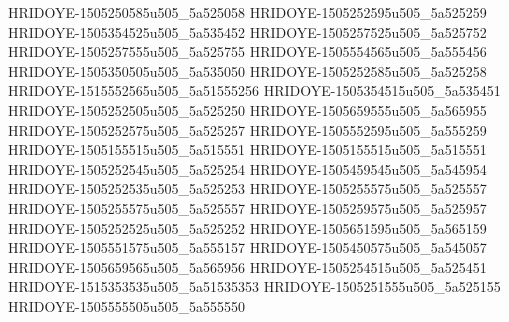 HRIDOYE-1505250585u505_5a525058
HRIDOYE-1505252595u505_5a525259
HRIDOYE-1505354525u505_5a535452
HRIDOYE-1505257525u505_5a525752
HRIDOYE-1505257555u505_5a525755
HRIDOYE-1505554565u505_5a555456
HRIDOYE-1505350505u505_5a535050
HRIDOYE-1505252585u505_5a525258
HRIDOYE-1515552565u505_5a51555256
HRIDOYE-1505354515u505_5a535451
HRIDOYE-1505252505u505_5a525250
HRIDOYE-1505659555u505_5a565955
HRIDOYE-1505252575u505_5a525257
HRIDOYE-1505552595u505_5a555259
HRIDOYE-1505155515u505_5a515551
HRIDOYE-1505155515u505_5a515551
HRIDOYE-1505252545u505_5a525254
HRIDOYE-1505459545u505_5a545954
HRIDOYE-1505252535u505_5a525253
HRIDOYE-1505255575u505_5a525557
HRIDOYE-1505255575u505_5a525557
HRIDOYE-1505259575u505_5a525957
HRIDOYE-1505252525u505_5a525252
HRIDOYE-1505651595u505_5a565159
HRIDOYE-1505551575u505_5a555157
HRIDOYE-1505450575u505_5a545057
HRIDOYE-1505659565u505_5a565956
HRIDOYE-1505254515u505_5a525451
HRIDOYE-1515353535u505_5a51535353
HRIDOYE-1505251555u505_5a525155
HRIDOYE-1505555505u505_5a555550

